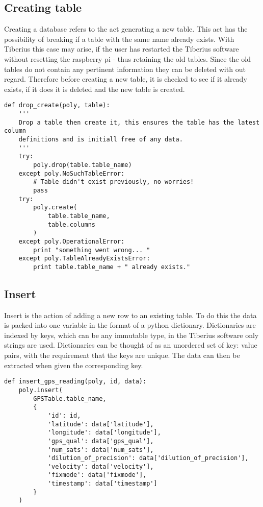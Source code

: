 \subsection{Creating table}
\label{create}
Creating a database refers to the act generating a new table. This act has the possibility of breaking if a table with the same name already exists. With Tiberius this case may arise, if the user has restarted the Tiberius software without resetting the raspberry pi - thus retaining the old tables. Since the old tables do not contain any pertinent information they can be deleted with out regard. Therefore before creating a new table, it is checked to see if it already exists, if it does it is deleted and the new table is created. 

\begin{lstlisting}[style=custompython]
def drop_create(poly, table):
    '''
    Drop a table then create it, this ensures the table has the latest column
    definitions and is initiall free of any data.
    '''
    try:
        poly.drop(table.table_name)
    except poly.NoSuchTableError:
        # Table didn't exist previously, no worries!
        pass
    try:
        poly.create(
            table.table_name,
            table.columns
        )
    except poly.OperationalError:
        print "something went wrong... "
    except poly.TableAlreadyExistsError:
        print table.table_name + " already exists."
\end{lstlisting}


\subsection{Insert}
Insert is the action of adding a new row to an existing table. 
To do this the data is packed into one variable in the format of a python dictionary. Dictionaries are indexed by keys, which can be any immutable type, in the Tiberius software only strings are used. Dictionaries can be thought of as an unordered set of key: value pairs, with the requirement that the keys are unique. The data can then be extracted when given the corresponding key.

\begin{lstlisting}[style=custompython]
def insert_gps_reading(poly, id, data):
    poly.insert(
        GPSTable.table_name,
        {
            'id': id,
            'latitude': data['latitude'],
            'longitude': data['longitude'],
            'gps_qual': data['gps_qual'],
            'num_sats': data['num_sats'],
            'dilution_of_precision': data['dilution_of_precision'],
            'velocity': data['velocity'],
            'fixmode': data['fixmode'],
            'timestamp': data['timestamp']
        }
    )
\end{lstlisting}

